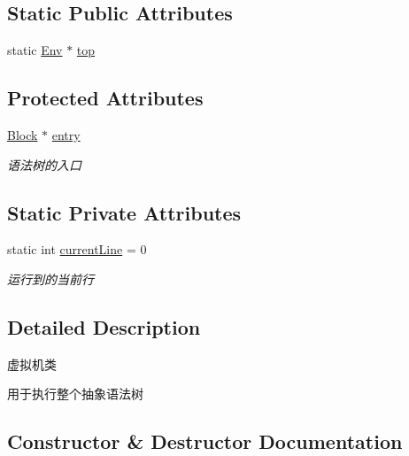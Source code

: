 \subsection*{Static Public Attributes}
\begin{DoxyCompactItemize}
\item 
static \hyperlink{class_env}{Env} $\ast$ \hyperlink{class_vm_a1a83823801a5ab090d9ad20527a6c638}{top}
\end{DoxyCompactItemize}
\subsection*{Protected Attributes}
\begin{DoxyCompactItemize}
\item 
\mbox{\label{class_vm_ab5aae972ea15ddfd01362e27ed797a51}} 
\hyperlink{class_block}{Block} $\ast$ \hyperlink{class_vm_ab5aae972ea15ddfd01362e27ed797a51}{entry}
\begin{DoxyCompactList}\small\item\em 语法树的入口 \end{DoxyCompactList}\end{DoxyCompactItemize}
\subsection*{Static Private Attributes}
\begin{DoxyCompactItemize}
\item 
\mbox{\label{class_vm_acfa435ede93d1ba8fe2250fd3469de15}} 
static int \hyperlink{class_vm_acfa435ede93d1ba8fe2250fd3469de15}{current\+Line} = 0
\begin{DoxyCompactList}\small\item\em 运行到的当前行 \end{DoxyCompactList}\end{DoxyCompactItemize}


\subsection{Detailed Description}
虚拟机类 

用于执行整个抽象语法树 

\subsection{Constructor \& Destructor Documentation}
\mbox{\label{class_vm_a4a37106b5b5b9382baa79dea901db8ba}} 
